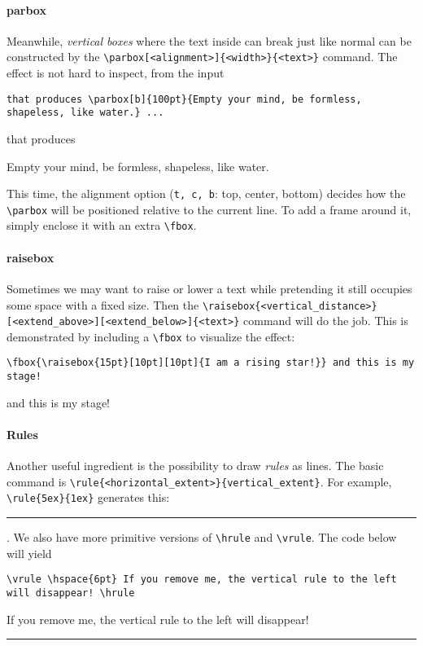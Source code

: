 \paragraph{parbox}
Meanwhile, \textit{vertical boxes} where the text inside can break just like normal can be constructed by the \texttt{\textbackslash parbox[<alignment>]\{<width>\}\{<text>\}} command. The effect is not hard to inspect, from the input
\begin{lstlisting}
that produces \parbox[b]{100pt}{Empty your mind, be formless, shapeless, like water.} ...
\end{lstlisting}
that produces \parbox[b]{100pt}{Empty your mind, be formless, shapeless, like water.} This time, the alignment option (\verb|t, c, b|: top, center, bottom) decides how the \texttt{\textbackslash parbox} will be positioned relative to the current line. To add a frame around it, simply enclose it with an extra \texttt{\textbackslash fbox}.

\paragraph{raisebox}
Sometimes we may want to raise or lower a text while pretending it still occupies some space with a fixed size. Then the \texttt{\textbackslash raisebox\{<vertical\allowbreak\_distance>\}[<extend\_above>][<extend\_below>]\{<text>\}} command will do the job. This is demonstrated by including a \texttt{\textbackslash fbox} to visualize the effect:
\begin{lstlisting}
\fbox{\raisebox{15pt}[10pt][10pt]{I am a rising star!}} and this is my stage!
\end{lstlisting}
\fbox{\raisebox{15pt}[10pt][10pt]{I am a rising star!}} and this is my stage!

\paragraph{Rules}
Another useful ingredient is the possibility to draw \textit{rules} as lines. The basic command is \texttt{\textbackslash rule\{<horizontal\_extent>\}\{vertical\_extent\}}. For example, \texttt{\textbackslash rule\{5ex\}\{1ex\}} generates this: \rule{5ex}{1ex}. We also have more primitive versions of \texttt{\textbackslash hrule} and \texttt{\textbackslash vrule}. The code below will yield
\begin{lstlisting}
\vrule \hspace{6pt} If you remove me, the vertical rule to the left will disappear! \hrule
\end{lstlisting}
\vrule \hspace{6pt} If you remove me, the vertical rule to the left will disappear!  \hrule

